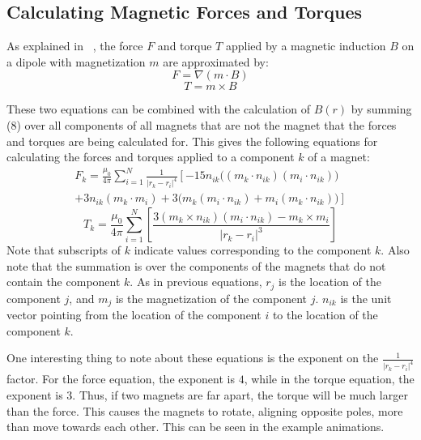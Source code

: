 \documentclass[tog]{acmsiggraph}
\begin{document}
\subsection{Calculating Magnetic Forces and Torques}

As explained in ~\cite{Thomaszewski:2008:MIM}, the force $F$ and torque $T$ applied by a magnetic induction $B$ on a dipole with magnetization $m$ are approximated by:
\begin{equation}
F = \nabla(m \cdot B)
\end{equation}
\begin{equation}
T = m \times B
\end{equation}

These two equations can be combined with the calculation of $B(r)$ by summing (8) over all components of all magnets that are not the magnet that the forces and torques are being calculated for. This gives the following equations for calculating the forces and torques applied to a component $k$ of a magnet:
\begin{equation}
\begin{split}
F_k = \frac{\mu_0}{4\pi}\sum_{i=1}^N \frac{1}{\left|r_k - r_i\right|^4}\left[-15n_{ik}\bigl((m_k \cdot n_{ik})(m_i \cdot n_{ik})\bigr) \right. \\
\left. + 3n_{ik}(m_k \cdot m_i) + 3\bigl(m_k(m_i \cdot n_{ik}) + m_i(m_k \cdot n_{ik})\bigr)\right]
\end{split}
\end{equation}
\begin{equation}
T_k = \frac{\mu_0}{4\pi}\sum_{i=1}^N \left[ \frac{3(m_k \times n_{ik})(m_i \cdot n_{ik}) - m_k \times m_i}{\left| r_k - r_i \right|^3} \right]
\end{equation}
Note that subscripts of $k$ indicate values corresponding to the component $k$. Also note that the summation is over the components of the magnets that do not contain the component $k$. As in previous equations, $r_j$ is the location of the component $j$, and $m_j$ is the magnetization of the component $j$. $n_{ik}$ is the unit vector pointing from the location of the component $i$ to the location of the component $k$.

One interesting thing to note about these equations is the exponent on the $\frac{1}{\left|r_k - r_i\right|^4}$ factor. For the force equation, the exponent is $4$, while in the torque equation, the exponent is $3$. Thus, if two magnets are far apart, the torque will be much larger than the force. This causes the magnets to rotate, aligning opposite poles, more than move towards each other. This can be seen in the example animations.
\end{document}
